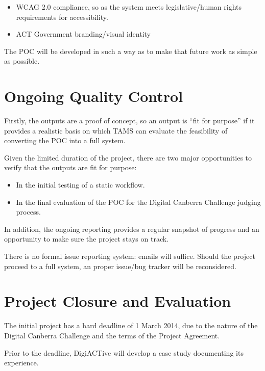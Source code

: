 \documentclass[12pt,a4paper,twosided]{article}
\begin{document}
\begin{itemize}
\itemsep1pt\parskip0pt
\item
  WCAG 2.0 compliance, so as the system meets legislative/human rights
  requirements for accessibility.
\item
  ACT Government branding/visual identity
\end{itemize}

The POC will be developed in such a way as to make that future work as
simple as possible.

\section{Ongoing Quality Control}\label{ongoing-quality-control}

Firstly, the outputs are a proof of concept, so an output is ``fit for
purpose'' if it provides a realistic basis on which TAMS can evaluate
the feasibility of converting the POC into a full system.

Given the limited duration of the project, there are two major
opportunities to verify that the outputs are fit for purpose:

\begin{itemize}
\itemsep1pt\parskip0pt
\item
  In the initial testing of a static workflow.
\item
  In the final evaluation of the POC for the Digital Canberra Challenge
  judging process.
\end{itemize}

In addition, the ongoing reporting provides a regular snapshot of
progress and an opportunity to make sure the project stays on track.

There is no formal issue reporting system: emails will suffice. Should
the project proceed to a full system, an proper issue/bug tracker will
be reconsidered.

\section{Project Closure and
Evaluation}\label{project-closure-and-evaluation}

The initial project has a hard deadline of 1 March 2014, due to the
nature of the Digital Canberra Challenge and the terms of the Project
Agreement.

Prior to the deadline, DigiACTive will develop a case study documenting
its experience.
\end{document}
